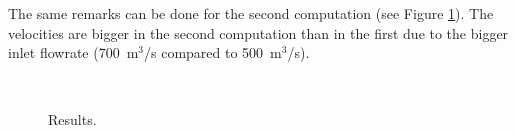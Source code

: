 The same remarks can be done for the second computation
(see Figure \ref{t2d:flotteurs:results2}).
The velocities are bigger in the second computation than in the first
due to the bigger inlet flowrate (700~m$^3$/s compared to 500~m$^3$/s).

\begin{figure}[H]
  \centering
   \\
  \caption{Results.}\label{t2d:flotteurs:results2}
\end{figure}
